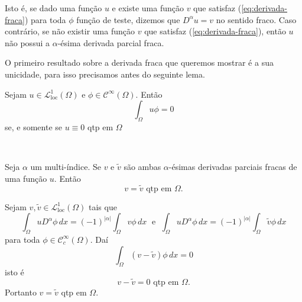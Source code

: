 \documentclass[a4paper, 11pt]{book}
\theoremstyle{definition}
\newcommand{\cC}{\mathcal{C}}
\newcommand{\cL}{\mathcal{L}}
\newcommand{\loc}{\mathrm{loc}}
\begin{document}
Isto é, se dado uma função $u$ e existe uma função $v$ que satisfaz (\ref{eq:derivada-fraca}) para toda $\phi$ função de teste, dizemos que $D^\alpha u = v$ no sentido fraco.
Caso contrário, se não existir uma função $v$ que satisfaz (\ref{eq:derivada-fraca}), então $u$ não possui a $\alpha$-ésima derivada parcial fraca.

O primeiro resultado sobre a derivada fraca que queremos mostrar é a sua unicidade, para isso precisamos antes do seguinte lema.

\begin{lbox}
    Sejam $u \in \cL^1_{\loc}(\Omega)$ e $\phi \in \cC^\infty(\Omega)$.
    Então
    \[
        \int_\Omega u \phi = 0
    \]
    se, e somente se $u \equiv 0$ qtp em $\Omega$
\end{lbox}
\begin{prf}
    ~
\end{prf}

\begin{pbox}
    Seja $\alpha$ um multi-índice. Se $v$ e $\tilde v$ são ambas $\alpha$-ésimas derivadas parciais fracas de uma função $u$.
    Então
    \[
        v = \tilde v \text{ qtp em } \Omega.
    \]
\end{pbox}
\begin{prf}
    Sejam $v, \tilde v \in \cL^1_{\mathrm{loc}}(\Omega)$ tais que
    \[
        \int_\Omega u D^\alpha \phi \,dx = (-1)^{|\alpha|} \int_\Omega v \phi \,dx \;\text{ e }\; \int_\Omega u D^\alpha \phi \, dx= (-1)^{|\alpha|}\int_\Omega \tilde v \phi \,dx
    \]
    para toda $\phi \in \cC^\infty_c(\Omega)$. Daí
    \[
        \int_\Omega (v - \tilde v) \phi \, dx = 0
    \]
    isto é
    \[
        v - \tilde v = 0 \text{ qtp em } \Omega.
    \]
    Portanto $v = \tilde v$ qtp em $\Omega$.
\end{prf}
\end{document}
